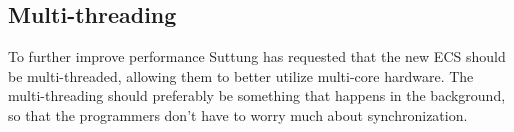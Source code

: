 
\subsection{Multi-threading}
\label{subsec:requirements_performance_multi_threading}
To further improve performance Suttung has requested that the new ECS should be multi-threaded, allowing them to better utilize multi-core hardware.
The multi-threading should preferably be something that happens in the background, so that the programmers don't have to worry much about synchronization.

